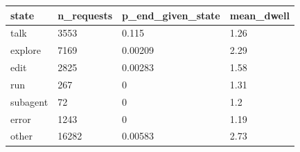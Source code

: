 \begin{tabular}{llll}
\toprule
state & n\_requests & p\_end\_given\_state & mean\_dwell \\
\midrule
talk & 3553 & 0.115 & 1.26 \\
explore & 7169 & 0.00209 & 2.29 \\
edit & 2825 & 0.00283 & 1.58 \\
run & 267 & 0 & 1.31 \\
subagent & 72 & 0 & 1.2 \\
error & 1243 & 0 & 1.19 \\
other & 16282 & 0.00583 & 2.73 \\
\bottomrule
\end{tabular}